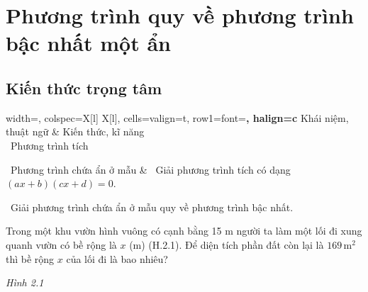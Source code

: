 \setcounter{section}{3}
\section[Phương trình quy về phương trình bậc nhất một ẩn]{Phương trình quy về phương trình\\bậc nhất một ẩn}

\begin{lesson}
    \subsection{Kiến thức trọng tâm}

    \begin{center}
        \begin{tblr}{
            width=\linewidth,
            colspec={X[l] X[l]},
            cells={valign=t},
            row{1}={font=\bfseries, halign=c}
        }
            Khái niệm, thuật ngữ & Kiến thức, kĩ năng \\
            \textbullet\ Phương trình tích\par
            \textbullet\ Phương trình chứa ẩn ở mẫu
            &
            \textbullet\ Giải phương trình tích có dạng $(ax+b)(cx+d)=0$.\par
            \textbullet\ Giải phương trình chứa ẩn ở mẫu quy về phương trình bậc nhất.
        \end{tblr}
    \end{center}

    Trong một khu vườn hình vuông có cạnh bằng 15 m người ta làm một lối đi xung quanh vườn có bề rộng là $x$ (m) (H.2.1). Để diện tích phần đất còn lại là $169\,\mathrm{m}^2$ thì bề rộng $x$ của lối đi là bao nhiêu?

    \begin{center}

        \textit{Hình 2.1}
    \end{center}


\end{lesson}

